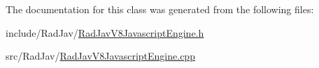 The documentation for this class was generated from the following files\+:\begin{DoxyCompactItemize}
\item 
include/\+Rad\+Jav/\hyperlink{_rad_jav_v8_javascript_engine_8h}{Rad\+Jav\+V8\+Javascript\+Engine.\+h}\item 
src/\+Rad\+Jav/\hyperlink{_rad_jav_v8_javascript_engine_8cpp}{Rad\+Jav\+V8\+Javascript\+Engine.\+cpp}\end{DoxyCompactItemize}
